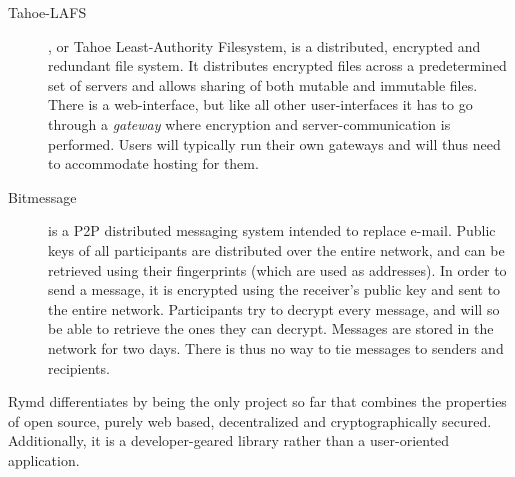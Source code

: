 \begin{description}
  \item[Tahoe-LAFS] \cite{Tahoe:2014:Online}, or Tahoe Least-Authority Filesystem, is a distributed, encrypted and redundant file system. It distributes encrypted files across a predetermined set of servers and allows sharing of both mutable and immutable files. There is a web-interface, but like all other user-interfaces it has to go through a \emph{gateway} where encryption and server-communication is performed. Users will typically run their own gateways and will thus need to accommodate hosting for them.
  \item[Bitmessage] \cite{Bitmessage:2014:Online} is a P2P distributed messaging system intended to replace e-mail. Public keys of all participants are distributed over the entire network, and can be retrieved using their fingerprints (which are used as addresses). In order to send a message, it is encrypted using the receiver's public key and sent to the entire network. Participants try to decrypt every message, and will so be able to retrieve the ones they can decrypt. Messages are stored in the network for two days. There is thus no way to tie messages to senders and recipients.

\end{description}

Rymd differentiates by being the only project so far that combines the properties of open source, purely web based, decentralized and cryptographically secured. Additionally, it is a developer-geared library rather than a user-oriented application.
